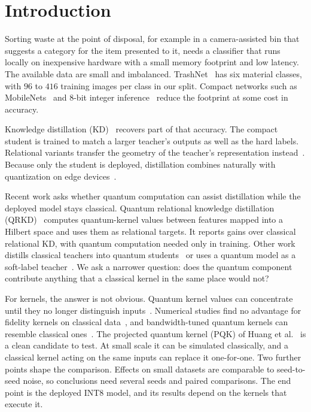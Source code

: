 \section{Introduction}
\label{sec:intro}

Sorting waste at the point of disposal, for example in a camera-assisted bin that suggests a category for the item presented to it, needs a classifier that runs locally on inexpensive hardware with a small memory footprint and low latency.
The available data are small and imbalanced. TrashNet~\citep{yang2016trashnet} has six material classes, with $96$ to $416$ training images per class in our split.
Compact networks such as MobileNets~\citep{sandler2018mobilenetv2,howard2019searching} and 8-bit integer inference~\citep{jacob2018quantization} reduce the footprint at some cost in accuracy.

Knowledge distillation (KD)~\citep{hinton2015distilling} recovers part of that accuracy. The compact student is trained to match a larger teacher's outputs as well as the hard labels.
Relational variants transfer the geometry of the teacher's representation instead~\citep{park2019relational,tian2020contrastive}.
Because only the student is deployed, distillation combines naturally with quantization on edge devices~\citep{paparounas2024evaluating}.

Recent work asks whether quantum computation can assist distillation while the deployed model stays classical.
Quantum relational knowledge distillation (QRKD)~\citep{liu2025qrkd} computes quantum-kernel values between features mapped into a Hilbert space and uses them as relational targets. It reports gains over classical relational KD, with quantum computation needed only in training.
Other work distills classical teachers into quantum students~\citep{li2024hybrid,hasan2023bridging} or uses a quantum model as a soft-label teacher~\citep{naqvi2026structured}.
We ask a narrower question: does the quantum component contribute anything that a classical kernel in the same place would not?

For kernels, the answer is not obvious.
Quantum kernel values can concentrate until they no longer distinguish inputs~\citep{thanasilp2024exponential}. Numerical studies find no advantage for fidelity kernels on classical data~\citep{slattery2023numerical}, and bandwidth-tuned quantum kernels can resemble classical ones~\citep{florezablan2025similarity}.
The projected quantum kernel (PQK) of Huang et al.~\citep{huang2021power} is a clean candidate to test. At small scale it can be simulated classically, and a classical kernel acting on the same inputs can replace it one-for-one.
Two further points shape the comparison. Effects on small datasets are comparable to seed-to-seed noise, so conclusions need several seeds and paired comparisons. The end point is the deployed INT8 model, and its results depend on the kernels that execute it.

